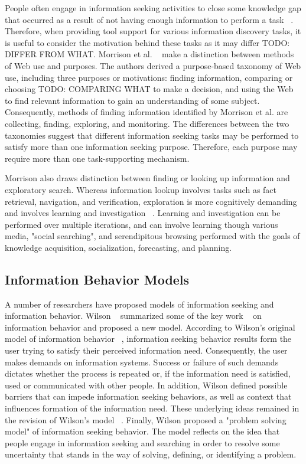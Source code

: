 \documentclass{casconpaper}
\begin{document}
{{People often engage in information seeking activities to close some knowledge gap that occurred as a result of not having enough information to perform a task ~\cite{proper}. Therefore, when providing tool support for various information discovery tasks, it is useful to consider the motivation behind these tasks as it may differ TODO: DIFFER FROM WHAT. Morrison et al. ~\cite{morrison} make a distinction between methods of Web use and purposes. The authors derived a purpose-based taxonomy of Web use, including three purposes or motivations: finding information, comparing or choosing TODO: COMPARING WHAT to make a decision, and using the Web to find relevant information to gain an understanding of some subject. Consequently, methods of finding information identified by Morrison et al. are collecting, finding, exploring, and monitoring. The differences between the two taxonomies suggest that different information seeking tasks may be performed to satisfy more than one information seeking purpose. Therefore, each purpose may require more than one task-supporting mechanism. 

Morrison also draws distinction between finding or looking up information and exploratory search. Whereas information lookup involves tasks such as fact retrieval, navigation, and verification, exploration is more cognitively demanding and involves learning and investigation ~\cite{marchionini}. Learning and investigation can be performed over multiple iterations, and can involve learning though various media, "social searching", and serendipitous browsing performed with the goals of knowledge acquisition, socialization, forecasting, and planning.  

} %

{\subsection{Information Behavior Models}

A number of researchers have proposed models of information seeking and information behavior. Wilson ~\cite{wilson1999} summarized some of the key work ~\cite{ellis1989, dervin, kuhlthau, wilson1997, wilson1981} on information behavior and proposed a new model. According to Wilson's original model of information behavior ~\cite{wilson1981}, information seeking behavior results form the user trying to satisfy their perceived information need. Consequently, the user makes demands on information systems. Success or failure of such demands dictates whether the process is repeated or, if the information need is satisfied, used or communicated with other people. In addition, Wilson defined possible barriers that can impede information seeking behaviors, as well as context that influences formation of the information need. These underlying ideas remained in the revision of Wilson's model ~\cite{wilson1997}. Finally, Wilson proposed a "problem solving model" of information seeking behavior. The model reflects on the idea that people engage in information seeking and searching in order to resolve some uncertainty that stands in the way of solving, defining, or identifying a problem.    

}}
\end{document}
